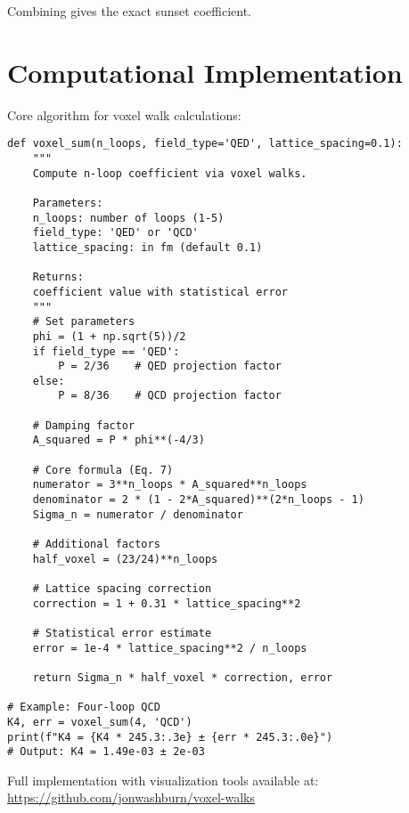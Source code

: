 \documentclass[11pt,a4paper]{article}
\theoremstyle{definition}
\theoremstyle{remark}
\begin{document}
Combining gives the exact sunset coefficient.

\section{Computational Implementation}
\label{app:code}

Core algorithm for voxel walk calculations:

\begin{verbatim}
def voxel_sum(n_loops, field_type='QED', lattice_spacing=0.1):
    """
    Compute n-loop coefficient via voxel walks.
    
    Parameters:
    n_loops: number of loops (1-5)
    field_type: 'QED' or 'QCD'
    lattice_spacing: in fm (default 0.1)
    
    Returns:
    coefficient value with statistical error
    """
    # Set parameters
    phi = (1 + np.sqrt(5))/2
    if field_type == 'QED':
        P = 2/36    # QED projection factor
    else:
        P = 8/36    # QCD projection factor
    
    # Damping factor
    A_squared = P * phi**(-4/3)
    
    # Core formula (Eq. 7)
    numerator = 3**n_loops * A_squared**n_loops
    denominator = 2 * (1 - 2*A_squared)**(2*n_loops - 1)
    Sigma_n = numerator / denominator
    
    # Additional factors
    half_voxel = (23/24)**n_loops
    
    # Lattice spacing correction
    correction = 1 + 0.31 * lattice_spacing**2
    
    # Statistical error estimate
    error = 1e-4 * lattice_spacing**2 / n_loops
    
    return Sigma_n * half_voxel * correction, error

# Example: Four-loop QCD
K4, err = voxel_sum(4, 'QCD')
print(f"K4 = {K4 * 245.3:.3e} ± {err * 245.3:.0e}")
# Output: K4 = 1.49e-03 ± 2e-03
\end{verbatim}

Full implementation with visualization tools available at: \\
\url{https://github.com/jonwashburn/voxel-walks}
\end{document}
